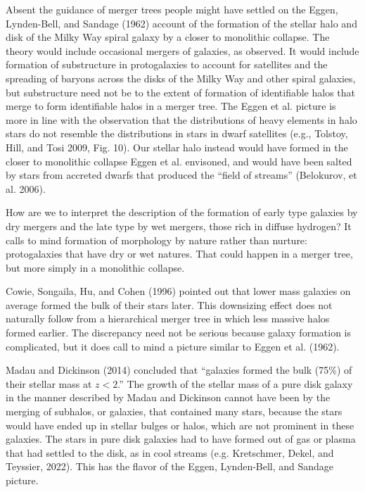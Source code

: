 \documentclass[fleqn,12pt]{article}
\begin{document}
Absent the guidance of merger trees people might have settled on the Eggen, Lynden-Bell, and Sandage (1962) account of the formation of the stellar halo and disk of the Milky Way spiral galaxy by a closer to monolithic collapse. The theory would include occasional mergers of galaxies, as observed. It would include formation of substructure in protogalaxies to account for satellites and the spreading of baryons across the disks of the Milky Way and other spiral galaxies, but substructure need not be to the extent of formation of identifiable halos that merge to form identifiable halos in a merger tree. The Eggen et al. picture is more in line with the observation that the distributions of heavy elements in halo stars do not resemble the distributions in stars in dwarf satellites (e.g., Tolstoy, Hill, and Tosi 2009, Fig. 10). Our stellar halo instead would have formed in the closer to monolithic collapse Eggen et al. envisoned, and would have been salted by stars from accreted dwarfs that produced the ``field of streams'' (Belokurov, et al. 2006).

How are we to interpret the description of the formation of early type galaxies by dry mergers and the late type by wet mergers, those rich in diffuse hydrogen? It calls to mind formation of morphology by nature rather than nurture: protogalaxies that have dry or wet natures. That could happen in a merger tree, but more simply in a monolithic collapse.

Cowie, Songaila, Hu, and Cohen (1996) pointed out that lower mass galaxies on average formed the bulk of their stars later. This downsizing effect does not naturally follow from a hierarchical merger tree in which less massive halos formed earlier. The discrepancy need not be serious because galaxy formation is complicated, but it does call to mind a picture similar to Eggen et al. (1962).

Madau and Dickinson (2014) concluded that ``galaxies formed the bulk (75\%) of their stellar mass at $z < 2$.'' The growth of the stellar mass of a pure disk galaxy in the manner described by Madau and Dickinson cannot have been by the merging of subhalos, or galaxies, that contained many stars, because the stars would have ended up in stellar bulges or halos, which are not prominent in these galaxies. The stars in pure disk galaxies had to have formed out of gas or plasma that had settled to the disk, as in cool streams (e.g. Kretschmer, Dekel, and Teyssier, 2022). This has the flavor of the Eggen, Lynden-Bell, and Sandage picture. 
\end{document}
